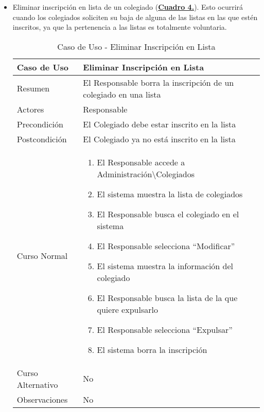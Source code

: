 \begin{itemize}
    \pagebreak
		\item \addtocounter{tabla}{1} Eliminar inscripción en lista de un colegiado (\textbf{\hyperref[tab:curEliminarInscrLst]{Cuadro 4.}}). Esto ocurrirá cuando los colegiados soliciten su baja de alguna de las listas en las que estén inscritos, ya que la pertenencia a las listas es totalmente voluntaria.
		\begin{table}[!htbp]
		  \centering  \addtocounter{casouso}{1}
		  \begin{tabular}{|l | p{100mm}|}
		    \textbf{Caso de Uso}  & \textbf{Eliminar Inscripción en Lista} \\ \hline
		    Resumen 		 & El Responsable borra la inscripción de un colegiado en una lista \\ \hline
		    Actores  		 & Responsable \\ \hline
		    Precondición  	 & El Colegiado debe estar inscrito en la lista \\ \hline
		    Postcondición  	 & El Colegiado ya no está inscrito en la lista \\ \hline
		    Curso Normal   	 & \begin{enumerate}
			  \item El Responsable accede a Administración\textbackslash Colegiados
			  \item El sistema muestra la lista de colegiados
			  \item El Responsable busca el colegiado en el sistema
			  \item El Responsable selecciona ``Modificar''
			  \item El sistema muestra la información del colegiado
			  \item El Responsable busca la lista de la que quiere expulsarlo
			  \item El Responsable selecciona ``Expulsar''
			  \item El sistema borra la inscripción
		    \end{enumerate}  \\ \hline
		    Curso Alternativo  & No  \\ \hline
		    Observaciones 	 & No \\ \hline
		  \end{tabular}
		  \caption{Caso de Uso  - Eliminar Inscripción en Lista}
		  \label{tab:curEliminarInscrLst}
		\end{table}
		\FloatBarrier
\end{itemize}

